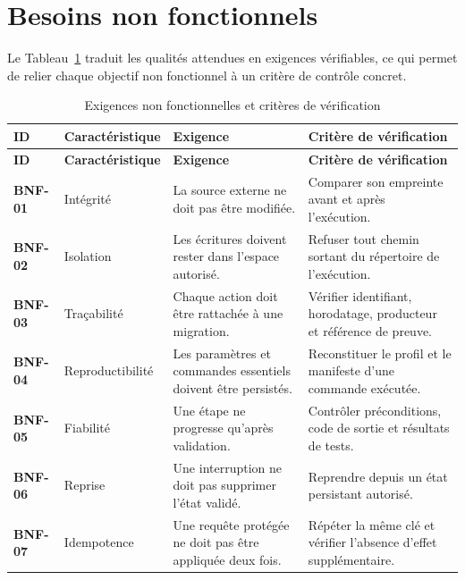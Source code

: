 \section{Besoins non fonctionnels}

Le Tableau~\ref{tab:bnf-ch1} traduit les qualités attendues en exigences vérifiables, ce qui permet de relier chaque objectif non fonctionnel à un critère de contrôle concret.

\scriptsize
\begin{longtable}{|>{\bfseries\RaggedRight\arraybackslash}p{1cm}|>{\RaggedRight\arraybackslash}p{2.5cm}|>{\RaggedRight\arraybackslash}p{5.1cm}|>{\RaggedRight\arraybackslash}p{5.1cm}|}
    \caption{Exigences non fonctionnelles et critères de vérification}\label{tab:bnf-ch1}\\
    \hline
    \rowcolor{cgilight!95}
    \textbf{ID} & \textbf{Caractéristique} & \textbf{Exigence} & \textbf{Critère de vérification} \\
    \hline
    \endfirsthead
    \hline
    \rowcolor{cgilight!95}
    \textbf{ID} & \textbf{Caractéristique} & \textbf{Exigence} & \textbf{Critère de vérification} \\
    \hline
    \endhead
    BNF-01 & Intégrité & La source externe ne doit pas être modifiée. & Comparer son empreinte avant et après l'exécution. \\
    \hline
    BNF-02 & Isolation & Les écritures doivent rester dans l'espace autorisé. & Refuser tout chemin sortant du répertoire de l'exécution. \\
    \hline
    BNF-03 & Traçabilité & Chaque action doit être rattachée à une migration. & Vérifier identifiant, horodatage, producteur et référence de preuve. \\
    \hline
    BNF-04 & Reproductibilité & Les paramètres et commandes essentiels doivent être persistés. & Reconstituer le profil et le manifeste d'une commande exécutée. \\
    \hline
    BNF-05 & Fiabilité & Une étape ne progresse qu'après validation. & Contrôler préconditions, code de sortie et résultats de tests. \\
    \hline
    BNF-06 & Reprise & Une interruption ne doit pas supprimer l'état validé. & Reprendre depuis un état persistant autorisé. \\
    \hline
    BNF-07 & Idempotence & Une requête protégée ne doit pas être appliquée deux fois. & Répéter la même clé et vérifier l'absence d'effet supplémentaire. \\

\end{longtable}

